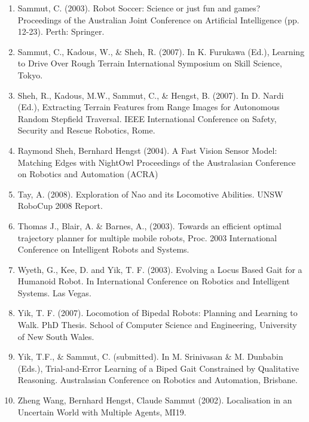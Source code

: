 \documentclass[runningheads,a4paper]{llncs}
\begin{document}
\begin{enumerate}
\item Sammut, C. (2003). Robot Soccer: Science or just fun and games? Proceedings of the Australian Joint Conference on Artificial Intelligence (pp. 12-23). Perth: Springer.
\item Sammut, C., Kadous, W., \& Sheh, R. (2007). In K. Furukawa (Ed.), Learning to Drive Over Rough Terrain International Symposium on Skill Science, Tokyo.
\item Sheh, R., Kadous, M.W., Sammut, C., \& Hengst, B. (2007). In D. Nardi (Ed.), Extracting Terrain Features from Range Images for Autonomous Random Stepfield Traversal. IEEE International Conference on Safety, Security and Rescue Robotics, Rome.
\item Raymond Sheh, Bernhard Hengst (2004). A Fast Vision Sensor Model: Matching Edges with NightOwl Proceedings of the Australasian Conference on Robotics and Automation (ACRA)
\item Tay, A. (2008). Exploration of Nao and its Locomotive Abilities. UNSW RoboCup 2008 Report.
\item Thomas J., Blair, A. \& Barnes, A., (2003). Towards an efficient optimal trajectory planner for multiple mobile robots, Proc. 2003 International Conference on Intelligent Robots and Systems.
\item Wyeth, G., Kee, D. and Yik, T. F. (2003). Evolving a Locus Based Gait for a Humanoid Robot. In International Conference on Robotics and Intelligent Systems. Las Vegas.
\item Yik, T. F. (2007).  Locomotion of Bipedal Robots: Planning and Learning to Walk. PhD Thesis. School of Computer Science and Engineering, University of New South Wales.
\item Yik, T.F., \& Sammut, C. (submitted). In M. Srinivasan \& M. Dunbabin (Eds.), Trial-and-Error Learning of a Biped Gait Constrained by Qualitative Reasoning. Australasian Conference on Robotics and Automation, Brisbane.
\item Zheng Wang, Bernhard Hengst, Claude Sammut (2002). Localisation in an Uncertain World with Multiple Agents, MI19.
\end{enumerate}
\end{document}
